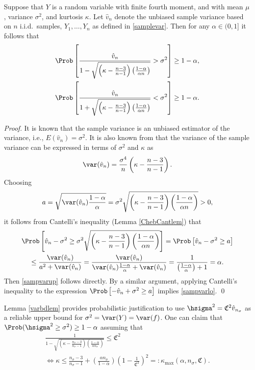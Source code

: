\documentclass[graybox]{svmult}
\newcommand{\hv}{\hat{v}}
\newcommand{\fudge}{\mathfrak{C}}
\begin{document}
\begin{lemma} \label{varbdlem}  Suppose that $Y$ is a random variable with finite fourth moment, and with mean $\mu$, variance $\sigma^2$, and kurtosis $\kappa$.  Let $\hv_{n}$ denote the unbiased sample variance based on $n$ i.i.d.\ samples, $Y_1, \ldots, Y_n$ as defined in \eqref{samplevar}.  Then for any $\alpha \in (0,1]$ it follows that
\begin{subequations} \label{sampvarbd}
\begin{gather} \label{sampvarup}
\Prob \left[\frac{\hv_{n}}{1 - \sqrt{\left ( \kappa  - \frac{n-3}{n-1}\right)\left(\frac{1-\alpha}{\alpha n}\right)}} > \sigma^2 \right] \ge 1 - \alpha, \\
\label{sampvarlo}
\Prob \left[\frac{\hv_{n}}{1 + \sqrt{\left ( \kappa  - \frac{n-3}{n-1}\right)\left(\frac{1-\alpha}{\alpha n}\right)}} < \sigma^2 \right] \ge 1 - \alpha.
\end{gather}
\end{subequations}
\end{lemma}

\begin{proof} It is known that the sample variance is an unbiased estimator of the variance, i.e., $E(\hv_n)=\sigma^2$.  It is also known from \cite{??} that the variance of the sample variance can be expressed in terms of $\sigma^2$ and $\kappa$ as
\[
\var(\hv_n) = \frac{\sigma^4}{n} \left ( \kappa  - \frac{n-3}{n-1} \right).
\]
Choosing
$$a=\sqrt{\var(\hv_n) \frac{1-\alpha}{\alpha} } = \sigma^2\sqrt{\left(\kappa-\frac{n-3}{n-1}\right)\left(\frac{1-\alpha}{\alpha n}\right)} >0,
$$
it follows from Cantelli's inequality (Lemma \ref{ChebCantlem})  that
\begin{multline*}
\Prob\left[\hv_n-\sigma^2 \geq
\sigma^2\sqrt{\left(\kappa-\frac{n-3}{n-1}\right)\left(\frac{1-\alpha}{\alpha n}\right)} \right]  = \Prob\left[\hv_n-\sigma^2 \geq
a \right]\\
 \leq \frac{\var(\hv_n)}{a^2+\var(\hv_n)} 
=\frac{\var(\hv_n)}{\var(\hv_n) \frac{1-\alpha}{\alpha}+\var(\hv_n)}  
=\frac{1}{\left(\frac{1-\alpha}{\alpha}\right)+1}=\alpha.
\end{multline*}
Then \eqref{sampvarup} follows directly.  By a similar argument, applying Cantelli's inequality to the expression $\Prob\left[-\hv_n+\sigma^2 \ge a \right]$ implies  \eqref{sampvarlo}. \qed
\end{proof}

Lemma \ref{varbdlem} provides probabilistic justification to use $\hsigma^2 = \fudge^2 \hv_{n_{\sigma}}$ as a reliable upper bound for $\sigma^2=\var(Y)=\var(f)$.  One can claim that $\Prob(\hsigma^2 \ge \sigma^2) \ge 1-\alpha$ assuming that
\begin{multline}
\frac{1}{1 - \sqrt{\left ( \kappa  - \frac{n_{\sigma}-3}{n_{\sigma}-1}\right)\left(\frac{1-\alpha}{\alpha n_{\sigma}}\right)}} \le \fudge^2
\\
\iff \kappa \le \frac{n_{\sigma}-3}{n_{\sigma}-1} + \left(\frac{ \alpha n_{\sigma}}{1-\alpha}\right) \left(1 - \frac{1}{\fudge^2}\right)^2 =: \kappa_{\max} (\alpha,n_{\sigma},\fudge). \label{kappamaxdef}
\end{multline}
\end{document}

